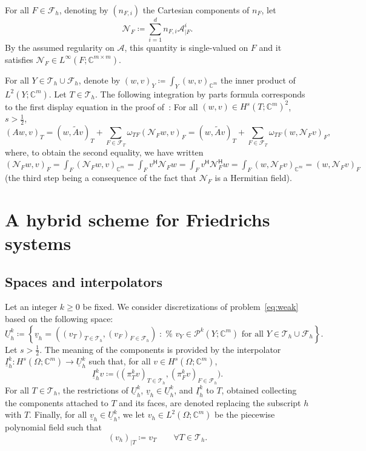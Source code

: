 \documentclass[11pt,a4paper]{article}
\newcounter{corr}
\theoremstyle{plain}
\theoremstyle{remark}
\theoremstyle{definition}
\newcommand{\Complex}{\mathbb{C}}
\newcommand{\herm}{\mathsf{H}}
\newcommand{\st}{\;:\;}
\newcommand{\Th}{\mathcal{T}_h}
\newcommand{\Fh}{\mathcal{F}_h}
\newcommand{\FT}{\mathcal{F}_T}
\newcommand{\Poly}[1]{\mathcal{P}^{#1}}
\newcommand{\lproj}[2]{\pi^{#1}_{#2}}
\newcommand{\Uh}{\underline{U}_h^k}
\newcommand{\Ih}{\underline{I}_h^k}
\begin{document}
For all $F \in \Fh$, denoting by $(n_{F,i})$ the Cartesian components of $n_F$, let
\[
\mathcal{N}_F \coloneqq \sum_{i = 1}^d n_{F,i} \mathcal{A}^i_{|F}.
\]
By the assumed regularity on $\mathcal{A}$, this quantity is single-valued on $F$ and it satisfies $\mathcal{N}_F \in L^\infty(F;\Complex^{m\times m})$.

For all $Y \in \Th \cup \Fh$, denote by $(w,v)_Y \coloneqq \int_Y (w,v)_{\Complex^m}$ the inner product of $L^2(Y;\Complex^m)$.
Let $T \in \Th$.
The following integration by parts formula corresponds to the first display equation in the proof of~\cite[Lemma~60.1]{Ern.Guermond:21*2}:
For all $(w,v) \in H^s(T;\Complex^m)^2$, $s > \frac12$,
\begin{equation}\label{eq:ibp:local}
  (A w, v)_T
  = (w, \tilde{A} v)_T + \sum_{F \in \FT} \omega_{TF} (\mathcal{N}_F w, v)_F
  = (w, \tilde{A} v)_T + \sum_{F \in \FT} \omega_{TF} (w, \mathcal{N}_F v)_F,
\end{equation}
where, to obtain the second equality, we have written $(\mathcal{N}_F w, v)_F = \int_F (\mathcal{N}_F w, v)_{\Complex^m} = \int_F v^\herm \mathcal{N}_F w = \int_F v^\herm \mathcal{N}_F^\herm w = \int_F (w, \mathcal{N}_F v)_{\Complex^m} = (w, \mathcal{N}_F v)_F$ (the third step being a consequence of the fact that $\mathcal{N}_F$ is a Hermitian field).


\section{A hybrid scheme for Friedrichs systems}\label{sec:scheme}

\subsection{Spaces and interpolators}

Let an integer $k \ge 0$ be fixed.
We consider discretizations of problem~\eqref{eq:weak} based on the following space:
\[
\underline{U}_h^k \coloneqq \left\{
\underline{v}_h = ( (v_T)_{T \in \Th}, (v_F)_{F \in \Fh} )
\st
\text{%
  $v_Y \in \Poly{k}(Y;\Complex^m)$ for all $Y \in \Th \cup \Fh$
}
\right\}.
\]
Let $s > \frac12$.
The meaning of the components is provided by the interpolator $\Ih : H^s(\Omega;\Complex^m) \to \Uh$ such that, for all $v \in H^s(\Omega;\Complex^m)$,
\[
\Ih v \coloneqq
\big(
(\lproj{k}{T} v)_{T \in \Th},
(\lproj{k}{F} v)_{F \in \Fh}
\big).
\]
For all $T \in \Th$, the restrictions of $\Uh$, $\underline{v}_h \in \Uh$, and $\Ih$ to $T$, obtained collecting the components attached to $T$ and its faces, are denoted replacing the subscript $h$ with $T$.
Finally, for all $\underline{v}_h \in \Uh$, we let $v_h \in L^2(\Omega;\Complex^m)$ be the piecewise polynomial field such that
\begin{equation}\label{eq:vh}
  (v_h)_{|T} \coloneqq v_T \qquad \forall T \in \Th.
\end{equation}
\end{document}

